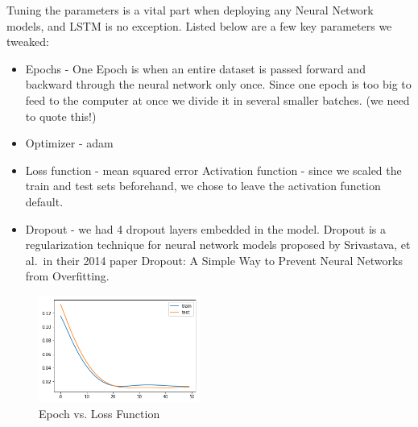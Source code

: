 \documentclass[12pt,oneside]{chicagocapstone}
\providecommand{\tightlist}{%
  \setlength{\itemsep}{0pt}\setlength{\parskip}{0pt}}
\begin{document}
Tuning the parameters is a vital part when deploying any Neural Network models, and LSTM is no exception. Listed below are a few key parameters we tweaked:
\begin{itemize}
\tightlist
\item
  Epochs - One Epoch is when an entire dataset is passed forward and backward through the neural network only once. Since one epoch is too big to feed to the computer at once we divide it in several smaller batches. (we need to quote this!)
\item
  Optimizer - adam
\item
  Loss function - mean squared error
  Activation function - since we scaled the train and test sets beforehand, we chose to leave the activation function default.
\item
  Dropout - we had 4 dropout layers embedded in the model. Dropout is a regularization technique for neural network models proposed by Srivastava, et al.~in their 2014 paper Dropout: A Simple Way to Prevent Neural Networks from Overfitting.
\end{itemize}
\begin{figure}

{\centering \includegraphics[width=200px,angle = 0, scale=1.5]{figure/image17} 

}

\caption{Epoch vs. Loss Function}\label{fig:image17}
\end{figure}
\end{document}
